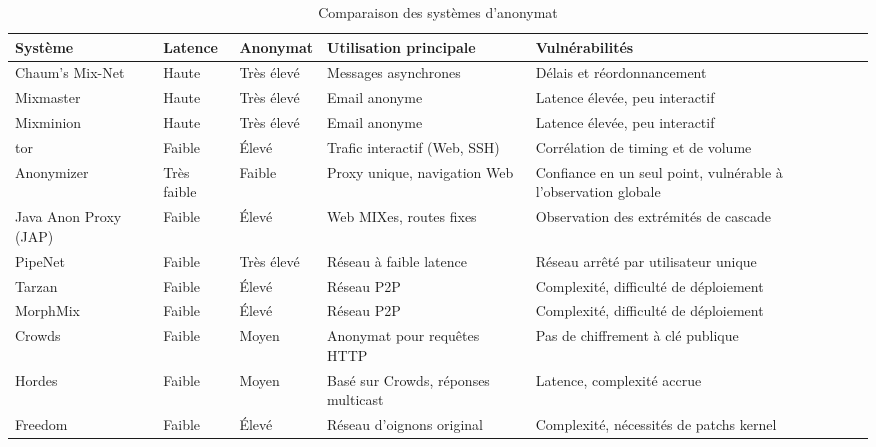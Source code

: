 \begin{table}[htbp]
    \centering
    \begin{tabularx}{\textwidth}{
        >{\raggedright\arraybackslash}X
        >{\raggedright\arraybackslash}X
        >{\raggedright\arraybackslash}X
        >{\raggedright\arraybackslash}X
        >{\raggedright\arraybackslash}X}
        \toprule
    \rowcolor[HTML]{EFEFEF}    
    \textbf{Système} & \textbf{Latence} & \textbf{Anonymat} & \textbf{Utilisation principale} & \textbf{Vulnérabilités} \\
    \midrule
    Chaum's Mix-Net & Haute & Très élevé & Messages asynchrones & Délais et réordonnancement \\
    \midrule
    Mixmaster & Haute & Très élevé & Email anonyme & Latence élevée, peu interactif \\
    \midrule
    Mixminion & Haute & Très élevé & Email anonyme & Latence élevée, peu interactif \\
    \midrule
    \acrshort{tor} & Faible & Élevé & Trafic interactif (Web, SSH) & Corrélation de timing et de volume \\
    \midrule
    Anonymizer & Très faible & Faible & Proxy unique, navigation Web & Confiance en un seul point, vulnérable à l'observation globale \\
    \midrule
    Java Anon Proxy (JAP) & Faible & Élevé & Web MIXes, routes fixes & Observation des extrémités de cascade \\
    \midrule
    PipeNet & Faible & Très élevé & Réseau à faible latence & Réseau arrêté par utilisateur unique \\
    \midrule
    Tarzan & Faible & Élevé & Réseau P2P & Complexité, difficulté de déploiement \\
    \midrule
    MorphMix & Faible & Élevé & Réseau P2P & Complexité, difficulté de déploiement \\
    \midrule
    Crowds & Faible & Moyen & Anonymat pour requêtes HTTP & Pas de chiffrement à clé publique \\
    \midrule
    Hordes & Faible & Moyen & Basé sur Crowds, réponses multicast & Latence, complexité accrue \\
    \midrule
    Freedom & Faible & Élevé & Réseau d'oignons original & Complexité, nécessités de patchs kernel \\
    \bottomrule
    \end{tabularx}
    \caption{Comparaison des systèmes d'anonymat}
    \label{tab:systems-vs}
    \end{table}
    
